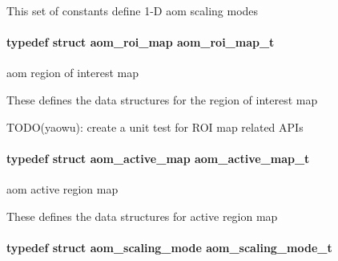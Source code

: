 This set of constants define 1-\/D aom scaling modes 
\paragraph[{\texorpdfstring{aom\+\_\+roi\+\_\+map\+\_\+t}{aom_roi_map_t}}]{\setlength{\rightskip}{0pt plus 5cm}typedef struct {\bf aom\+\_\+roi\+\_\+map}  {\bf aom\+\_\+roi\+\_\+map\+\_\+t}}\hypertarget{group__aom__encoder_gae682e0031e08270a2e0a60928305a830}{}\label{group__aom__encoder_gae682e0031e08270a2e0a60928305a830}


aom region of interest map 

These defines the data structures for the region of interest map

T\+O\+D\+O(yaowu)\+: create a unit test for R\+OI map related A\+P\+Is 
\paragraph[{\texorpdfstring{aom\+\_\+active\+\_\+map\+\_\+t}{aom_active_map_t}}]{\setlength{\rightskip}{0pt plus 5cm}typedef struct {\bf aom\+\_\+active\+\_\+map}  {\bf aom\+\_\+active\+\_\+map\+\_\+t}}\hypertarget{group__aom__encoder_gaaba582f3bd806cb3a0a6b8a66c1041e5}{}\label{group__aom__encoder_gaaba582f3bd806cb3a0a6b8a66c1041e5}


aom active region map 

These defines the data structures for active region map 
\paragraph[{\texorpdfstring{aom\+\_\+scaling\+\_\+mode\+\_\+t}{aom_scaling_mode_t}}]{\setlength{\rightskip}{0pt plus 5cm}typedef struct {\bf aom\+\_\+scaling\+\_\+mode}  {\bf aom\+\_\+scaling\+\_\+mode\+\_\+t}}\hypertarget{group__aom__encoder_ga8d9d932b058ba7e762cd39d403dd4e68}{}\label{group__aom__encoder_ga8d9d932b058ba7e762cd39d403dd4e68}



